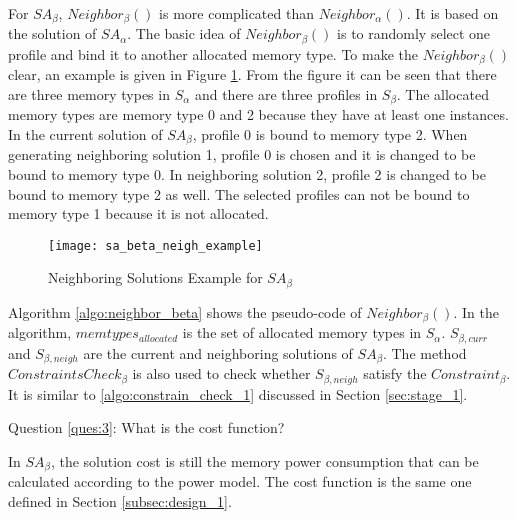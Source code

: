 		For $SA_{\beta}$, $Neighbor_{\beta}()$ is more complicated than
		$Neighbor_{\alpha}()$. It is based on the solution of $SA_{\alpha}$.
		The basic idea of $Neighbor_{\beta}()$ is to randomly select one profile
		and bind it to another allocated memory type.
		To make the $Neighbor_{\beta}()$ clear, an example is given in
		Figure \ref{fig:sa_beta_neigh_example}.
		From the figure it can be seen that there are three
		memory types in $S_{\alpha}$ and there are three profiles in $S_{\beta}$.
		The allocated memory types are memory type 0 and 2 because they have at least one instances.
		In the current solution of $SA_{\beta}$, profile 0 is bound to
		memory type 2.
		When generating neighboring solution 1, profile 0 is chosen and it is changed to
		be bound to memory type 0.
		In neighboring solution 2, profile 2 is changed to be bound to memory type 2
		as well.
		The selected profiles can not be bound to memory type 1 because it is not allocated.
		\begin{figure}[h]
			\begin{center}
				\texttt{[image: sa\_beta\_neigh\_example]}
				\caption{Neighboring Solutions Example for $SA_{\beta}$}
				\label{fig:sa_beta_neigh_example}
			\end{center}
		\end{figure}		
	
		Algorithm \ref{algo:neighbor_beta} shows the pseudo-code of
		$Neighbor_{\beta}()$.
		In the algorithm, $memtypes_{allocated}$ is the set of allocated
		memory types in $S_{\alpha}$.
		$S_{\beta,curr}$ and $S_{\beta,neigh}$ are the current and 
		neighboring solutions of $SA_{\beta}$.
		The method $ConstraintsCheck_{\beta}$ is also used to check whether
		$S_{\beta,neigh}$ satisfy the $Constraint_{\beta}$. It is similar to
		\ref{algo:constrain_check_1} discussed in Section \ref{sec:stage_1}.
		
	
		Question \ref{ques:3}: What is the cost function?
	
		In $SA_{\beta}$, the solution cost is still the memory power consumption
		that can be calculated according to the power model. The cost function is
		the same one defined in Section \ref{subsec:design_1}.
		
